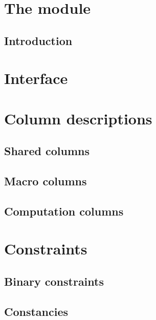 
\section{The \rlpUtilsMod{} module}
\subsection{Introduction}                    \label{rlp utils: introduction}                          

\section{Interface}			     \label{rlp utils: rlp* / rlp utils interface}          

\section{Column descriptions}                \label{rlp utils: column descriptions}                   
\subsection{Shared columns}                                                                           
\subsection{Macro columns}                                                                            
\subsection{Computation columns}                                                                      

\section{Constraints}                        \label{rlp utils: constraints}
\subsection{Binary constraints}              \label{rlp utils: constraints: binarities}               
\subsection{Constancies}                     \label{rlp utils: constraints: constancies}              

